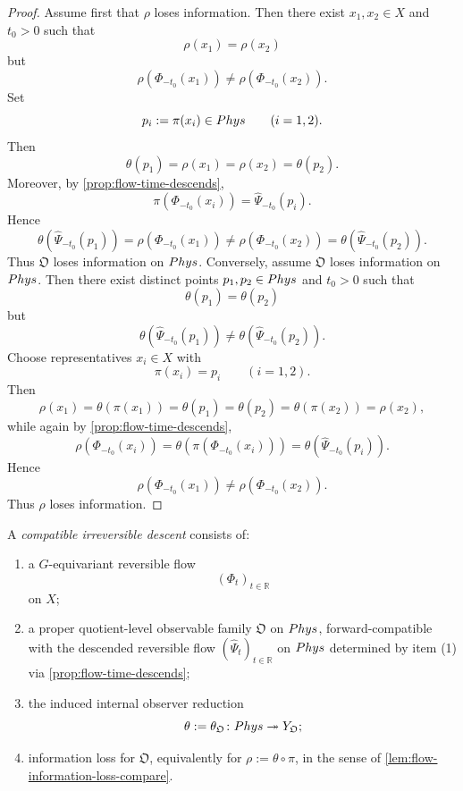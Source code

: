 \begin{proof}
	Assume first that \(\rho\) loses information. Then there exist
	\(x_1,x_2\in X\) and \(t_0>0\) such that
	\[
		\rho(x_1)=\rho(x_2)
	\]
	but
	\[
		\rho(\Phi_{-t_0}(x_1))\neq \rho(\Phi_{-t_0}(x_2)).
	\]
	Set
	\[
		p_i:=\pi(x_i)\in Phys
		\qquad
		(i=1,2).
	\]
	Then
	\[
		\theta(p_1)=\rho(x_1)=\rho(x_2)=\theta(p_2).
	\]
	Moreover, by \cref{prop:flow-time-descends},
	\[
		\pi(\Phi_{-t_0}(x_i))=\widehat\Psi_{-t_0}(p_i).
	\]
	Hence
	\[
		\theta(\widehat\Psi_{-t_0}(p_1))
		=
		\rho(\Phi_{-t_0}(x_1))
		\neq
		\rho(\Phi_{-t_0}(x_2))
		=
		\theta(\widehat\Psi_{-t_0}(p_2)).
	\]
	Thus \(\mathfrak O\) loses information on \(Phys\).
	Conversely, assume \(\mathfrak O\) loses information on \(Phys\). Then
	there exist distinct points \(p_1,p_2\in Phys\) and \(t_0>0\) such that
	\[
		\theta(p_1)=\theta(p_2)
	\]
	but
	\[
		\theta(\widehat\Psi_{-t_0}(p_1))
		\neq
		\theta(\widehat\Psi_{-t_0}(p_2)).
	\]
	Choose representatives \(x_i\in X\) with
	\[
		\pi(x_i)=p_i
		\qquad
		(i=1,2).
	\]
	Then
	\[
		\rho(x_1)=\theta(\pi(x_1))=\theta(p_1)=\theta(p_2)=\theta(\pi(x_2))=\rho(x_2),
	\]
	while again by \cref{prop:flow-time-descends},
	\[
		\rho(\Phi_{-t_0}(x_i))
		=
		\theta(\pi(\Phi_{-t_0}(x_i)))
		=
		\theta(\widehat\Psi_{-t_0}(p_i)).
	\]
	Hence
	\[
		\rho(\Phi_{-t_0}(x_1))
		\neq
		\rho(\Phi_{-t_0}(x_2)).
	\]
	Thus \(\rho\) loses information.
\end{proof}
\begin{definition}
	A \emph{compatible irreversible descent} consists of:
	\begin{enumerate}[label=\textup{(\arabic*)}]
		\item a \(G\)-equivariant reversible flow
		      \[
			      (\Phi_t)_{t\in\mathbb R}
		      \]
		      on \(X\);
		\item a proper quotient-level observable family \(\mathfrak O\) on
		      \(Phys\), forward-compatible with the descended reversible flow
		      \((\widehat\Psi_t)_{t\in\mathbb R}\) on \(Phys\) determined by
		      item \textup{(1)} via \cref{prop:flow-time-descends};
		\item the induced internal observer reduction
		      \[
			      \theta:=\theta_{\mathfrak O}\colon Phys\twoheadrightarrow Y_{\mathfrak O};
		      \]
		\item information loss for \(\mathfrak O\), equivalently for
		      \(\rho:=\theta\circ\pi\), in the sense of
		      \cref{lem:flow-information-loss-compare}.
	\end{enumerate}
\end{definition}
